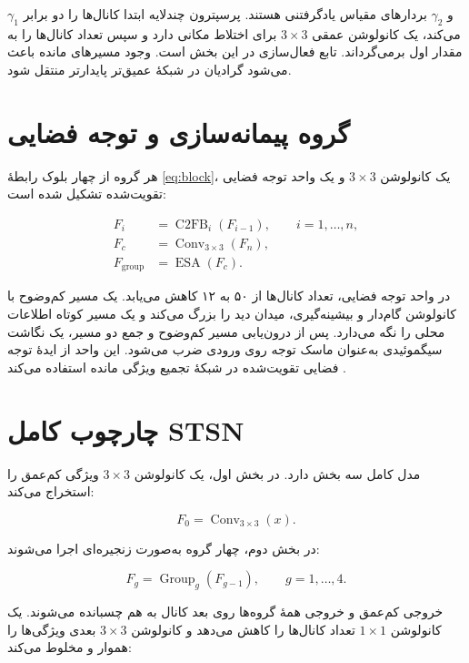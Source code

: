 $\gamma_1$ و $\gamma_2$ بردارهای مقیاس یادگرفتنی هستند. پرسپترون چندلایه ابتدا کانال‌ها را دو برابر می‌کند، یک کانولوشن عمقی $3\times3$ برای اختلاط مکانی دارد و سپس تعداد کانال‌ها را به مقدار اول برمی‌گرداند. تابع فعال‌سازی در این بخش  است. وجود مسیرهای مانده باعث می‌شود گرادیان در شبکهٔ عمیق‌تر پایدارتر منتقل شود.

\section{گروه پیمانه‌سازی و توجه فضایی}

هر گروه از چهار بلوک رابطهٔ \ref{eq:block}، یک کانولوشن $3\times3$ و یک واحد توجه فضایی تقویت‌شده تشکیل شده است:

\begin{align}
F_i &= \operatorname{C2FB}_{i}(F_{i-1}),\qquad i=1,\ldots,n,\\
F_c &= \operatorname{Conv}_{3\times3}(F_n),\\
F_{\mathrm{group}} &= \operatorname{ESA}(F_c).
\end{align}

در واحد توجه فضایی، تعداد کانال‌ها از ۵۰ به ۱۲ کاهش می‌یابد. یک مسیر کم‌وضوح با کانولوشن گام‌دار و بیشینه‌گیری، میدان دید را بزرگ می‌کند و یک مسیر کوتاه اطلاعات محلی را نگه می‌دارد. پس از درون‌یابی مسیر کم‌وضوح و جمع دو مسیر، یک نگاشت سیگموئیدی به‌عنوان ماسک توجه روی ورودی ضرب می‌شود. این واحد از ایدهٔ توجه فضایی تقویت‌شده در شبکهٔ تجمیع ویژگی مانده استفاده می‌کند \cite{Liu2020}.

\section{چارچوب کامل STSN}

مدل کامل سه بخش دارد. در بخش اول، یک کانولوشن $3\times3$ ویژگی کم‌عمق را استخراج می‌کند:

\begin{equation}
F_0=\operatorname{Conv}_{3\times3}(x).
\end{equation}

در بخش دوم، چهار گروه به‌صورت زنجیره‌ای اجرا می‌شوند:

\begin{equation}
F_g=\operatorname{Group}_g(F_{g-1}),\qquad g=1,\ldots,4.
\end{equation}

خروجی کم‌عمق و خروجی همهٔ گروه‌ها روی بعد کانال به هم چسبانده می‌شوند. یک کانولوشن $1\times1$ تعداد کانال‌ها را کاهش می‌دهد و کانولوشن $3\times3$ بعدی ویژگی‌ها را هموار و مخلوط می‌کند:

